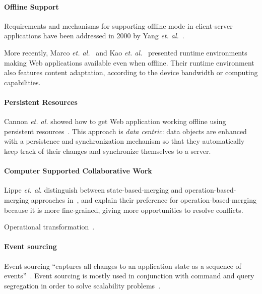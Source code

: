 \documentclass{llncs}
\begin{document}
\paragraph{Offline Support}

Requirements and mechanisms for supporting offline mode in client-server applications have been addressed in 2000 by Yang \emph{et. al.}~\cite{Yang2000_OfflineMode}.

More recently, Marco \emph{et. al.}~\cite{Marco11_InterruptionResilience} and Kao \emph{et. al.}~\cite{Kao12_WOPRE} presented runtime environments making Web applications available even when offline. Their runtime environment also features content adaptation, according to the device bandwidth or computing capabilities.

\paragraph{Persistent Resources}

Cannon \emph{et. al.} showed how to get Web application working offline using persistent resources~\cite{Cannon10_Persistence}. This approach is \emph{data centric}: data objects are enhanced with a persistence and synchronization mechanism so that they automatically keep track of their changes and synchronize themselves to a server.

\cite{Benson10_SyncKit}

\paragraph{Computer Supported Collaborative Work}

Lippe \emph{et. al.} distinguish between state-based-merging and operation-based-merging approaches in~\cite{Lippe92_Merging}, and explain their preference for operation-based-merging because it is more fine-grained, giving more opportunities to resolve conflicts.

Operational transformation~\cite{Sun98_OTR}.

\paragraph{Event sourcing}

Event sourcing ``captures all changes to an application state as a sequence of events''~\cite{Fowler05_ES}. Event sourcing is mostly used in conjunction with command and query segregation in order to solve scalability problems~\cite{Betts13_CQRS}.
\end{document}
